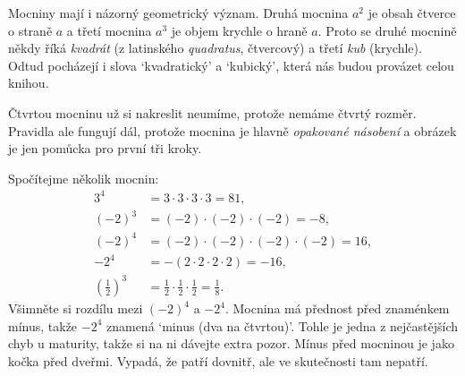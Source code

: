 Mocniny mají i názorný geometrický význam. Druhá mocnina $a^2$ je obsah čtverce o straně $a$ a třetí mocnina $a^3$ je objem krychle o hraně $a$. Proto se druhé mocnině někdy říká \textit{kvadrát} (z latinského \textit{quadratus}, čtvercový) a třetí \textit{kub} (krychle). Odtud pocházejí i slova `kvadratický' a `kubický', která nás budou provázet celou knihou.
\begin{center}
\end{center}
Čtvrtou mocninu už si nakreslit neumíme, protože nemáme čtvrtý rozměr. Pravidla ale fungují dál, protože mocnina je hlavně \textit{opakované násobení} a obrázek je jen pomůcka pro první tři kroky.

\begin{example}
  Spočítejme několik mocnin:
  \begin{align*}
    3^4 &= 3\cdot 3\cdot 3\cdot 3 = 81,\\
    {(-2)}^3 &= (-2)\cdot(-2)\cdot(-2) = -8,\\
    {(-2)}^4 &= (-2)\cdot(-2)\cdot(-2)\cdot(-2) = 16,\\
    -2^4 &= -(2\cdot 2\cdot 2\cdot 2) = -16,\\
    {\left(\tfrac{1}{2}\right)}^3 &= \tfrac{1}{2}\cdot\tfrac{1}{2}\cdot\tfrac{1}{2} = \tfrac{1}{8}.
  \end{align*}
  Všimněte si rozdílu mezi ${(-2)}^4$ a $-2^4$. Mocnina má přednost před znaménkem mínus, takže $-2^4$ znamená `minus (dva na čtvrtou)'. Tohle je jedna z nejčastějších chyb u maturity, takže si na ni dávejte extra pozor. Mínus před mocninou je jako kočka před dveřmi. Vypadá, že patří dovnitř, ale ve skutečnosti tam nepatří.
\end{example}

